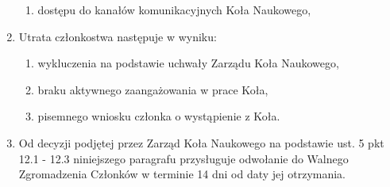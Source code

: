 \documentclass[12pt,a4paper]{article}
\begin{document}
\begin{enumerate}
            \begin{enumerate}
                \item dostępu do kanałów komunikacyjnych Koła Naukowego,
            \end{enumerate}
        \item Utrata członkostwa następuje w wyniku:
            \begin{enumerate}
                \item wykluczenia na podstawie uchwały Zarządu Koła Naukowego,
                \item braku aktywnego zaangażowania w prace Koła,
                \item pisemnego wniosku członka o wystąpienie z Koła.
            \end{enumerate}
        \item Od decyzji podjętej przez Zarząd Koła Naukowego na podstawie ust. 5 pkt 12.1 - 12.3 niniejszego paragrafu przysługuje odwołanie do Walnego Zgromadzenia Członków w terminie 14 dni od daty jej otrzymania.
    \end{enumerate}
\end{document}
